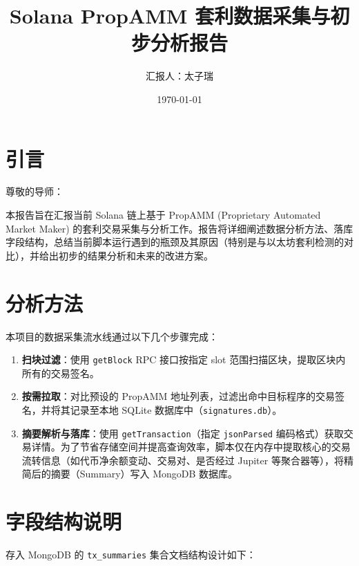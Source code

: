 \documentclass[a4paper,12pt]{article}
\title{\textbf{Solana PropAMM 套利数据采集与初步分析报告}}
\author{汇报人：太子瑞}
\date{\today}
\begin{document}
\maketitle

\section{引言}
尊敬的导师：

本报告旨在汇报当前 Solana 链上基于 PropAMM (Proprietary Automated Market Maker) 的套利交易采集与分析工作。报告将详细阐述数据分析方法、落库字段结构，总结当前脚本运行遇到的瓶颈及其原因（特别是与以太坊套利检测的对比），并给出初步的结果分析和未来的改进方案。

\section{分析方法}
本项目的数据采集流水线通过以下几个步骤完成：
\begin{enumerate}
    \item \textbf{扫块过滤}：使用 \texttt{getBlock} RPC 接口按指定 slot 范围扫描区块，提取区块内所有的交易签名。
    \item \textbf{按需拉取}：对比预设的 PropAMM 地址列表，过滤出命中目标程序的交易签名，并将其记录至本地 SQLite 数据库中（\texttt{signatures.db}）。
    \item \textbf{摘要解析与落库}：使用 \texttt{getTransaction}（指定 \texttt{jsonParsed} 编码格式）获取交易详情。为了节省存储空间并提高查询效率，脚本仅在内存中提取核心的交易流转信息（如代币净余额变动、交易对、是否经过 Jupiter 等聚合器等），将精简后的摘要（Summary）写入 MongoDB 数据库。
\end{enumerate}

\section{字段结构说明}
存入 MongoDB 的 \texttt{tx\_summaries} 集合文档结构设计如下：
\end{document}
